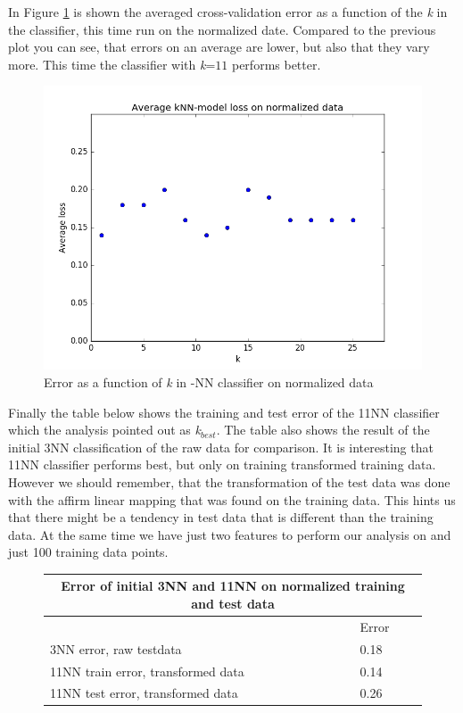 \documentclass{article}
\begin{document}
In Figure \ref{fig:figure2} is shown the averaged cross-validation error as a
function of the \textit{k} in the classifier, this time run on the normalized
date. Compared to the previous plot you can see, that errors on an average are
lower, but also that they vary more. This time the classifier with
\textit{k}=\(11\) performs better.

\begin{figure}[h]
  \centering
\includegraphics[scale=0.5]{figure_2}
\caption{Error as a function of \textit{k} in -NN classifier on
  normalized data}
\label{fig:figure2}
\end{figure}
\newpage
Finally the table below shows the training and test error of the 11NN classifier
which the analysis pointed out as \textit{k}\(_{best}\). The table also shows
the result of the initial 3NN classification of the raw data for comparison. It
is interesting that 11NN classifier performs best, but only on training
transformed training data. However we should remember, that the transformation
of the test data was done with the affirm linear mapping that was found on the
training data. This hints us that there might be a tendency in test data that is
different than the training data. At the same time we have just two features to
perform our analysis on and just 100 training data points.

\begin{figure}[h]
\centering
\begin{tabular}{ |p{8cm}||p{2cm}|  }
 \hline
 \multicolumn{2}{|c|}{Error of initial 3NN and 11NN on normalized training
   and test data}\\
 \hline
& Error \\
 \hline
 3NN error, raw testdata       & 0.18  \\
 11NN train error, transformed data  & 0.14 \\
 11NN test error, transformed data & 0.26 \\ 
 \hline
\end{tabular}
\end{figure}
\end{document}
